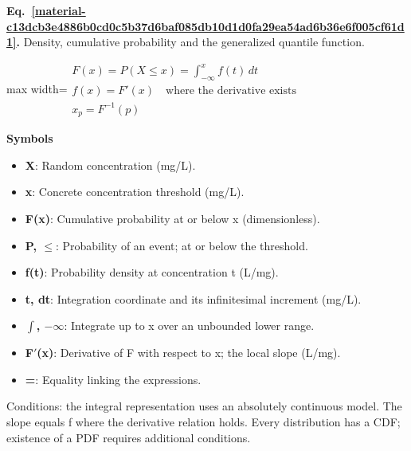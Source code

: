 \documentclass[11pt,a4paper]{article}
\begin{document}
\par\medskip
\noindent\begin{minipage}{\linewidth}
\label{material-c13dcb3e4886b0cd0c5b37d6baf085db10d1d0fa29ea54ad6b36e6f005cf61d1}
\noindent\textbf{Eq.~\ref*{material-c13dcb3e4886b0cd0c5b37d6baf085db10d1d0fa29ea54ad6b36e6f005cf61d1}.} Density, cumulative probability and the generalized quantile function.\par\nopagebreak
\begin{center}\begin{adjustbox}{max width=\linewidth}$\displaystyle \begin{gathered}F(x)=P(X\le x)=\int_{-\infty}^{x}f(t)\,dt\\f(x)=F'(x)\quad\text{where the derivative exists}\\x_p=F^{-1}(p)\end{gathered}$\end{adjustbox}\end{center}

\par\noindent\textbf{Symbols}

\begin{itemize}\setlength{\itemsep}{1pt}\setlength{\parsep}{0pt}
\item \textbf{X}: Random concentration (mg/L).
\item \textbf{x}: Concrete concentration threshold (mg/L).
\item \textbf{F(x)}: Cumulative probability at or below x (dimensionless).
\item \textbf{P, \ensuremath{\le}}: Probability of an event; at or below the threshold.
\item \textbf{f(t)}: Probability density at concentration t (L/mg).
\item \textbf{t, dt}: Integration coordinate and its infinitesimal increment (mg/L).
\item \textbf{\ensuremath{\int}, \ensuremath{-}\ensuremath{\infty}}: Integrate up to x over an unbounded lower range.
\item \textbf{F\ensuremath{\prime}(x)}: Derivative of F with respect to x; the local slope (L/mg).
\item \textbf{=}: Equality linking the expressions.
\end{itemize}

Conditions: the integral representation uses an absolutely continuous model. The slope equals f where the derivative relation holds. Every distribution has a CDF; existence of a PDF requires additional conditions.


\end{minipage}
\end{document}

